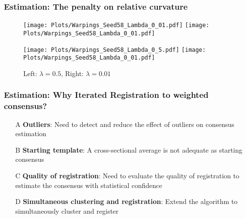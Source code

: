 \documentclass[10pt,dvipsnames,table]{beamer}
\begin{document}
\begin{frame}
\frametitle{Estimation: The penalty on relative curvature}
\vspace{-0.5cm}
\begin{figure}[H]
\texttt{[image: Plots/Warpings\_Seed58\_Lambda\_0\_01.pdf]}
\texttt{[image: Plots/Warpings\_Seed58\_Lambda\_0\_01.pdf]}
\end{figure}
\vspace{-0.5cm}

\begin{figure}[H]
\texttt{[image: Plots/Warpings\_Seed58\_Lambda\_0\_5.pdf]}
\texttt{[image: Plots/Warpings\_Seed58\_Lambda\_0\_01.pdf]}
\caption{Left: $\lambda = 0.5$, Right: $\lambda = 0.01$}
\end{figure}

\end{frame}

\begin{frame}
\frametitle{Estimation: Why Iterated Registration to weighted consensus?}
\begin{enumerate}
\item[A] {\bf{Outliers}}: Need to detect and reduce the effect of outliers on consensus estimation

\item[B] {\bf{Starting template}}: A cross-sectional average is not adequate as starting consensus

\item[C] {\bf{Quality of registration}}: Need to evaluate the quality of registration to estimate the consensus with statistical confidence

\item[D] {\bf{Simultaneous clustering and registration}}: Extend the algorithm to simultaneously cluster and register
\end{enumerate}
\end{frame}
\end{document}

